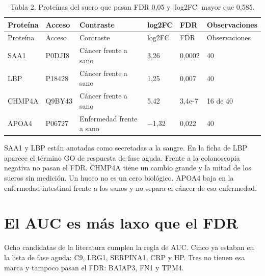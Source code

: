 \documentclass[12pt,oneside]{report}
\begin{document}
\begin{longtable}{p{2.58cm} p{2.58cm} p{2.58cm} p{2.58cm} p{2.58cm} p{2.58cm}}
\caption{Tabla 2. Proteínas del suero que pasan FDR 0,05 y |log2FC| mayor que 0,585.}\\
\toprule
Proteína & Acceso & Contraste & log2FC & FDR & Observaciones\\
\midrule
\endfirsthead
\toprule
Proteína & Acceso & Contraste & log2FC & FDR & Observaciones\\
\midrule
\endhead
SAA1 & P0DJI8 & Cáncer frente a sano & 3,26 & 0,0002 & 40\\
LBP & P18428 & Cáncer frente a sano & 1,25 & 0,007 & 40\\
CHMP4A & Q9BY43 & Cáncer frente a sano & 5,42 & 3,4e-7 & 16 de 40\\
APOA4 & P06727 & Enfermedad frente a sano & −1,32 & 0,022 & 40\\
\bottomrule
\end{longtable}
SAA1 y LBP están anotadas como secretadas a la sangre. En la ficha de LBP aparece el término GO de respuesta de fase aguda. Frente a la colonoscopia negativa no pasan el FDR. CHMP4A tiene un cambio grande y la mitad de los sueros sin medición. Un hueco no es un cero biológico. APOA4 baja en la enfermedad intestinal frente a los sanos y no separa el cáncer de esa enfermedad.

\section{El AUC es más laxo que el FDR}
Ocho candidatas de la literatura cumplen la regla de AUC. Cinco ya estaban en la lista de fase aguda: C9, LRG1, SERPINA1, CRP y HP. Tres no tienen esa marca y tampoco pasan el FDR: BAIAP3, FN1 y TPM4.
\end{document}
